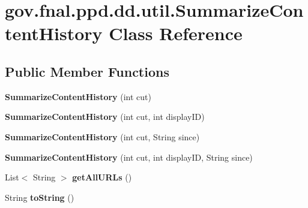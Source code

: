 \hypertarget{classgov_1_1fnal_1_1ppd_1_1dd_1_1util_1_1SummarizeContentHistory}{\section{gov.\-fnal.\-ppd.\-dd.\-util.\-Summarize\-Content\-History Class Reference}
\label{classgov_1_1fnal_1_1ppd_1_1dd_1_1util_1_1SummarizeContentHistory}
}
\subsection*{Public Member Functions}
\begin{DoxyCompactItemize}
\item 
\hypertarget{classgov_1_1fnal_1_1ppd_1_1dd_1_1util_1_1SummarizeContentHistory_a5f43324217aed65034807f5ce5b2e139}{{\bfseries Summarize\-Content\-History} (int cut)}\label{classgov_1_1fnal_1_1ppd_1_1dd_1_1util_1_1SummarizeContentHistory_a5f43324217aed65034807f5ce5b2e139}

\item 
\hypertarget{classgov_1_1fnal_1_1ppd_1_1dd_1_1util_1_1SummarizeContentHistory_ae671f3d8e29ddc2c90cb942d0ddcfa93}{{\bfseries Summarize\-Content\-History} (int cut, int display\-I\-D)}\label{classgov_1_1fnal_1_1ppd_1_1dd_1_1util_1_1SummarizeContentHistory_ae671f3d8e29ddc2c90cb942d0ddcfa93}

\item 
\hypertarget{classgov_1_1fnal_1_1ppd_1_1dd_1_1util_1_1SummarizeContentHistory_a5288f0ac3e16c1dca9cf1b9b34894038}{{\bfseries Summarize\-Content\-History} (int cut, String since)}\label{classgov_1_1fnal_1_1ppd_1_1dd_1_1util_1_1SummarizeContentHistory_a5288f0ac3e16c1dca9cf1b9b34894038}

\item 
\hypertarget{classgov_1_1fnal_1_1ppd_1_1dd_1_1util_1_1SummarizeContentHistory_aea18fd212882ca4d966340494e0c51d5}{{\bfseries Summarize\-Content\-History} (int cut, int display\-I\-D, String since)}\label{classgov_1_1fnal_1_1ppd_1_1dd_1_1util_1_1SummarizeContentHistory_aea18fd212882ca4d966340494e0c51d5}

\item 
\hypertarget{classgov_1_1fnal_1_1ppd_1_1dd_1_1util_1_1SummarizeContentHistory_a9522d14eff35263cd4a873903581671b}{List$<$ String $>$ {\bfseries get\-All\-U\-R\-Ls} ()}\label{classgov_1_1fnal_1_1ppd_1_1dd_1_1util_1_1SummarizeContentHistory_a9522d14eff35263cd4a873903581671b}

\item 
\hypertarget{classgov_1_1fnal_1_1ppd_1_1dd_1_1util_1_1SummarizeContentHistory_ace26c8fd037dfa66a30cd4c07010e6b3}{String {\bfseries to\-String} ()}\label{classgov_1_1fnal_1_1ppd_1_1dd_1_1util_1_1SummarizeContentHistory_ace26c8fd037dfa66a30cd4c07010e6b3}

\end{DoxyCompactItemize}
